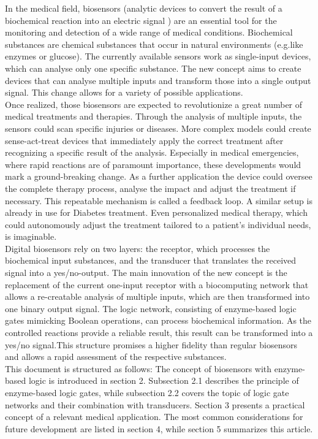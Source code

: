 \documentclass[runningheads]{llncs}
\begin{document}
	In the medical field, biosensors (analytic devices to convert the result of a biochemical reaction into an electric signal \cite{definitions}) are an essential tool for the monitoring and detection of a wide range of medical conditions. Biochemical substances are chemical substances that occur in natural environments (e.g.like enzymes or glucose). The currently available sensors work as single-input devices, which can analyse only one specific substance. The new concept aims to create devices that can analyse multiple inputs and transform those into a single output signal. This change allows for a variety of possible applications. \cite{original}\\
	\newline
	Once realized, those biosensors are expected to revolutionize a great number of medical treatments and therapies. Through the analysis of multiple inputs, the sensors could scan specific injuries or diseases. More complex models could create sense-act-treat devices that immediately apply the correct treatment after recognizing a specific result of the analysis. Especially in medical emergencies, where rapid reactions are of paramount importance, these developments would mark a ground-breaking change. As a further application the device could oversee the complete therapy process, analyse the impact and adjust the treatment if necessary. This repeatable mechanism is called a feedback loop. A similar setup is already in use for Diabetes treatment. Even personalized medical therapy, which could autonomously adjust the treatment tailored to a patient’s individual needs, is imaginable. \cite{original}\\
	\newline	
	Digital biosensors rely on two layers: the receptor, which processes the biochemical input substances, and the transducer that translates the received signal into a yes/no-output. \cite{state of the art} The main innovation of the new concept is the replacement of the current one-input receptor with a biocomputing network that allows a re-creatable analysis of multiple inputs, which are then transformed into one binary output signal. The logic network, consisting of enzyme-based logic gates mimicking Boolean operations, can process biochemical information.\cite{haupt} As the controlled reactions provide a reliable result, this result can be transformed into a yes/no signal.This structure promises a higher fidelity than regular biosensors and allows a rapid assessment of the respective substances. \\
	\newline
	This document is structured as follows: The concept of biosensors with enzyme-based logic is introduced in section 2. Subsection 2.1 describes the principle of enzyme-based logic gates, while subsection 2.2 covers the topic of logic gate networks and their combination with transducers. Section 3 presents a practical concept of a relevant medical application. The most common considerations for future development are listed in section 4, while section 5 summarizes this article.
	
\end{document}
